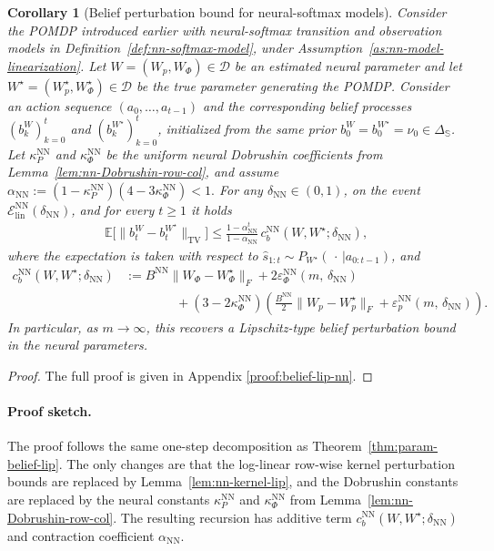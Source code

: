\documentclass[10pt]{article} %
\theoremstyle{plain}
\newtheorem{corollary}[theorem]{Corollary}
\theoremstyle{definition}
\theoremstyle{remark}
\newcommand{\bE}{\mathbb{E}}
\newcommand{\bS}{\mathbb{S}}
\begin{document}
\begin{corollary}[Belief perturbation bound for neural-softmax models]
\label{cor:nn-param-belief-lip}
Consider the POMDP introduced earlier with neural-softmax transition and observation models in Definition~\ref{def:nn-softmax-model}, under Assumption~\ref{as:nn-model-linearization}. Let \(W=(W_p,W_\Phi)\in\mathcal D\) be an estimated neural parameter and let \(W^\star=(W_p^\star,W_\Phi^\star)\in\mathcal D\) be the true parameter generating the POMDP. Consider an action sequence \((a_0,\dots,a_{t-1})\) and the corresponding belief processes \((b_k^W)_{k=0}^t\) and \((b_k^{W^\star})_{k=0}^t\), initialized from the same prior \(b_0^W=b_0^{W^\star}=\nu_0\in\Delta_{\bS}\). Let \(\kappa_P^{\mathrm{NN}}\) and \(\kappa_\Phi^{\mathrm{NN}}\) be the uniform neural Dobrushin coefficients from Lemma~\ref{lem:nn-Dobrushin-row-col}, and assume
\(
\alpha_{\mathrm{NN}}:=(1-\kappa_P^{\mathrm{NN}})(4-3\kappa_\Phi^{\mathrm{NN}})<1.
\)
For any \(\delta_{\mathrm{NN}}\in(0,1)\), on the event $\mathcal E_{\mathrm{lin}}^{\mathrm{NN}}(\delta_{\mathrm{NN}})$, and for every \(t\ge1\) it holds
\begin{align}\label{eq:nn-belief-lipschitz}
\bE\Big[\|b_t^W-b_t^{W^\star}\|_{\mathrm{TV}}\Big]
\le\frac{1-\alpha_{\mathrm{NN}}^t}{1-\alpha_{\mathrm{NN}}}\,
c_b^{\mathrm{NN}}(W,W^\star;\delta_{\mathrm{NN}}),
\end{align}
where the expectation is taken with respect to \(\hat s_{1:t}\sim P_{W^\star}(\,\cdot\,|a_{0:t-1})\), and
\begin{align}\label{eq:cb-nn-def}
c_b^{\mathrm{NN}}(W,W^\star;\delta_{\mathrm{NN}})
&:=B^{\mathrm{NN}}\|W_\Phi-W_\Phi^\star\|_F
+2\varepsilon_\Phi^{\mathrm{NN}}(m,\,\delta_{\mathrm{NN}})\\
&\qquad\qquad+(3-2\kappa_\Phi^{\mathrm{NN}})
\left(\frac{B^{\mathrm{NN}}}{2}\|W_p-W_p^\star\|_F
+\varepsilon_{p}^{\mathrm{NN}}(m,\,\delta_{\mathrm{NN}})\right).
\end{align}
In particular, as \(m\to\infty\), this recovers a Lipschitz-type belief perturbation bound in the neural parameters.
\end{corollary}

\begin{proof}
The full proof is given in Appendix \ref{proof:belief-lip-nn}.
\end{proof}

\paragraph{Proof sketch.}
The proof follows the same one-step decomposition as Theorem~\ref{thm:param-belief-lip}. The only changes are that the log-linear row-wise kernel perturbation bounds are replaced by Lemma~\ref{lem:nn-kernel-lip}, and the Dobrushin constants are replaced by the neural constants \(\kappa_P^{\mathrm{NN}}\) and \(\kappa_\Phi^{\mathrm{NN}}\) from Lemma~\ref{lem:nn-Dobrushin-row-col}. The resulting recursion has additive term \(c_b^{\mathrm{NN}}(W,W^\star;\delta_{\mathrm{NN}})\) and contraction coefficient \(\alpha_{\mathrm{NN}}\).
\end{document}
